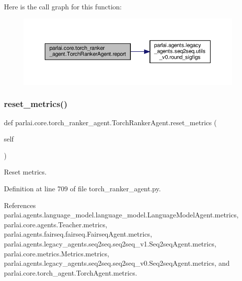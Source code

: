 Here is the call graph for this function\+:
\nopagebreak
\begin{figure}[H]
\begin{center}
\leavevmode
\includegraphics[width=350pt]{classparlai_1_1core_1_1torch__ranker__agent_1_1TorchRankerAgent_a6314748dfa9aaf6e26145af686d5787d_cgraph}
\end{center}
\end{figure}
\mbox{\label{classparlai_1_1core_1_1torch__ranker__agent_1_1TorchRankerAgent_ab526b2171567fd980451a795bb639cda}} 
\subsubsection{\texorpdfstring{reset\+\_\+metrics()}{reset\_metrics()}}
{\footnotesize\ttfamily def parlai.\+core.\+torch\+\_\+ranker\+\_\+agent.\+Torch\+Ranker\+Agent.\+reset\+\_\+metrics (\begin{DoxyParamCaption}\item[{}]{self }\end{DoxyParamCaption})}

\begin{DoxyVerb}Reset metrics.\end{DoxyVerb}
 

Definition at line 709 of file torch\+\_\+ranker\+\_\+agent.\+py.



References parlai.\+agents.\+language\+\_\+model.\+language\+\_\+model.\+Language\+Model\+Agent.\+metrics, parlai.\+core.\+agents.\+Teacher.\+metrics, parlai.\+agents.\+fairseq.\+fairseq.\+Fairseq\+Agent.\+metrics, parlai.\+agents.\+legacy\+\_\+agents.\+seq2seq.\+seq2seq\+\_\+v1.\+Seq2seq\+Agent.\+metrics, parlai.\+core.\+metrics.\+Metrics.\+metrics, parlai.\+agents.\+legacy\+\_\+agents.\+seq2seq.\+seq2seq\+\_\+v0.\+Seq2seq\+Agent.\+metrics, and parlai.\+core.\+torch\+\_\+agent.\+Torch\+Agent.\+metrics.

